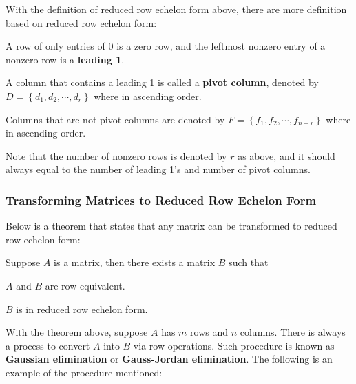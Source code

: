\documentclass[a4paper,12pt]{article}
\begin{document}
With the definition of reduced row echelon form above, there are more definition based on reduced row echelon form:\n

\begin{dft}
  \begin{alist}
    \item A row of only entries of $0$ is a zero row, and the leftmost nonzero entry of a nonzero row is a \textbf{leading 1}.
    \item A column that contains a leading 1 is called a \textbf{pivot column}, denoted by $D=\left\{ d_{1},d_{2},\cdots,d_{r}\right\}$ where in ascending order.
    \item Columns that are not pivot columns are denoted by $F=\left\{ f_{1},f_{2},\cdots,f_{n-r}\right\}$ where in ascending order.
  \end{alist}
\end{dft}\n

Note that the number of nonzero rows is denoted by $r$ as above, and it should always equal to the number of leading 1's and number of pivot columns.

\subsubsection{Transforming Matrices to Reduced Row Echelon Form}
Below is a theorem that states that any matrix can be transformed to reduced row echelon form:\n

\begin{thm}
  Suppose $A$ is a matrix, then there exists a matrix $B$ such that

  \begin{alist}
    \item $A$ and $B$ are row-equivalent.
    \item $B$ is in reduced row echelon form.
  \end{alist}
\end{thm}\n

With the theorem above, suppose $A$ has $m$ rows and $n$ columns. There is always a process to convert $A$ into $B$ via row operations. Such procedure is known as \textbf{Gaussian elimination} or \textbf{Gauss-Jordan elimination}. The following is an example of the procedure mentioned:\n
\end{document}
